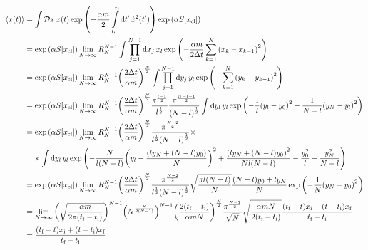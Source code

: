 \documentclass[twoside]{amsart}
\newcommand{\Dd}[1]{\mathcal D #1\: }
\numberwithin{equation}{section}
\begin{document}
\begin{align*}
    \expval{x\qty(t)}&=\int\Dd xx\qty(t)\exp\qty(-\frac{\alpha m}{2}\int\limits_{t_{\textnormal i}}^{t_{\textnormal f}}\dd{t'}\dot x^2\qty(t'))\exp\qty(\alpha S\qty[x_{\textnormal{cl}}])\\
    &=\exp\qty(\alpha S\qty[x_{\textnormal{cl}}])\lim\limits_{N\rightarrow\infty}R_N^{N-1}\int\prod\limits_{j=1}^{N-1}\dd{x_j}x_l\exp\qty(-\frac{\alpha m}{2\Delta t}\sum\limits_{k=1}^N\qty(x_k-x_{k-1})^2)\\
    &=\exp\qty(\alpha S\qty[x_{\textnormal{cl}}])\lim\limits_{N\rightarrow\infty}R_N^{N-1}\qty(\frac{2\Delta t}{\alpha m})^{\frac N2}\int\prod\limits_{j=1}^{N-1}\dd{y_j}y_l\exp\qty(-\sum\limits_{k=1}^N\qty(y_k-y_{k-1})^2)\\
    &=\exp\qty(\alpha S\qty[x_{\textnormal{cl}}])\lim\limits_{N\rightarrow\infty}R_N^{N-1}\qty(\frac{2\Delta t}{\alpha m})^{\frac N2}\frac{\pi^{\frac{l-1}{2}}}{l^{\frac12}}\frac{\pi^{\frac{N-l-1}{2}}}{\qty(N-l)^{\frac12}}\int\dd{y_l}y_l\exp\qty(-\frac{1}{l}\qty(y_l-y_0)^2-\frac{1}{N-l}\qty(y_N-y_l)^2)\\
    &=\exp\qty(\alpha S\qty[x_{\textnormal{cl}}])\lim\limits_{N\rightarrow\infty}R_N^{N-1}\qty(\frac{2\Delta t}{\alpha m})^{\frac N2}\frac{\pi^{\frac{N-2}{2}}}{l^{\frac12}\qty(N-l)^{\frac12}}\times\\
    &\quad\times\int\dd{y_l}y_l\exp\qty(-\frac{N}{l\qty(N-l)}\qty(y_l-\frac{\qty(ly_N+\qty(N-l)y_0)}{N})^2+\frac{\qty(ly_N+\qty(N-l)y_0)^2}{Nl\qty(N-l)}-\frac{y_0^2}{l}-\frac{y_N^2}{N-l})\\
    &=\exp\qty(\alpha S\qty[x_{\textnormal{cl}}])\lim\limits_{N\rightarrow\infty}R_N^{N-1}\qty(\frac{2\Delta t}{\alpha m})^{\frac N2}\frac{\pi^{\frac{N-2}{2}}}{l^{\frac12}\qty(N-l)^{\frac12}}\sqrt{\frac{\pi l\qty(N-l)}{N}}\frac{\qty(N-l)y_0+ly_N}{N}\exp\qty(-\frac1N\qty(y_N-y_0)^2)\\
    &=\lim\limits_{N\rightarrow\infty}\qty(\sqrt{\frac{\alpha m}{2\pi\qty(t_{\textnormal f}-t_{\textnormal i})}})^{N-1}\qty(N^{\frac{N}{2\qty(N-1)}})^{N-1}\qty(\frac{2\qty(t_{\textnormal f}-t_{\textnormal i})}{\alpha mN})^{\frac N2}\frac{\pi^{\frac{N-1}{2}}}{\sqrt N}\sqrt{\frac{\alpha m N}{2\qty(t_{\textnormal f}-t_{\textnormal i})}}\frac{\qty(t_{\textnormal f}-t)x_{\textnormal i}+\qty(t-t_{\textnormal i})x_{\textnormal f}}{t_{\textnormal f}-t_{\textnormal i}}\\
    &=\frac{\qty(t_{\textnormal f}-t)x_{\textnormal i}+\qty(t-t_{\textnormal i})x_{\textnormal f}}{t_{\textnormal f}-t_{\textnormal i}}
\end{align*}
\end{document}
